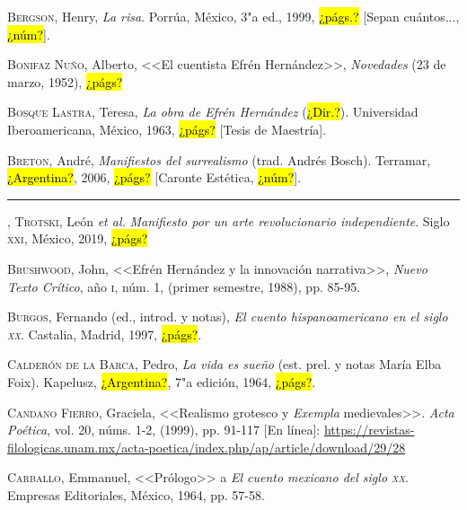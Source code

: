 \documentclass[14pt,twoside,final]{extbook} %
\begin{document}
\textsc{Bergson}, Henry, \emph{La risa}. Porrúa, México, 3"a ed., 1999, \hl{¿págs.?} [Sepan cuántos..., \hl{¿núm?}].\label{bib:bergson1999}

\textsc{Bonifaz Nuño}, Alberto, <<El cuentista Efrén Hernández>>, \emph{Novedades} (23 de marzo, 1952), \hl{¿págs?}\label{bib:bonifaz1952}

\textsc{Bosque Lastra}, Teresa, \emph{La obra de Efrén Hernández} (\hl{¿Dir.?}). Universidad Iberoamericana, México, 1963, \hl{¿págs?} [Tesis de Maestría].\label{bib:bosque1963}

\textsc{Breton}, André, \emph{Manifiestos del surrealismo} (trad. Andrés Bosch). Terramar, \hl{¿Argentina?}, 2006, \hl{¿págs?} [Caronte Estética, \hl{¿núm?}].\label{bib:breton2006}

\rule{1cm}{0.4pt}, \textsc{Trotski}, León \emph{et al.} \emph{Manifiesto por un arte revolucionario independiente}. Siglo \textsc{xxi}, México, 2019, \hl{¿págs?}\label{bib:breton2019}

\textsc{Brushwood}, John, <<Efrén Hernández y la innovación narrativa>>, \emph{Nuevo Texto Crítico}, año \textsc{i}, núm. 1, (primer semestre, 1988), pp. 85-95.\label{bib:}

\textsc{Burgos}, Fernando (ed., introd. y notas), \emph{El cuento hispanoamericano en el siglo \textsc{xx}}. Castalia, Madrid, 1997, \hl{¿págs?}.\label{bib:burgos1997}

\textsc{Calderón de la Barca}, Pedro, \emph{La vida es sueño} (est. prel. y notas María Elba Foix). Kapelusz, \hl{¿Argentina?}, 7"a edición, 1964, \hl{¿págs?}.\label{bib:calderon1964}

\textsc{Candano Fierro}, Graciela, <<Realismo grotesco y \emph{Exempla} medievales>>. \emph{Acta Poética}, vol. 20, núms. 1-2, (1999), pp. 91-117 [En línea]: \href{https://revistas-filologicas.unam.mx/acta-poetica/index.php/ap/article/download/29/28}{https://revistas-filologicas.unam.mx/acta-poetica/index.php/ap/article/download/29/28}\label{bib:candano1999}

\textsc{Carballo}, Emmanuel, <<Prólogo>> a \emph{El cuento mexicano del siglo \textsc{xx}}. Empresas Editoriales, México, 1964, pp. 57-58.\label{bib:carballo1964}
\end{document}
